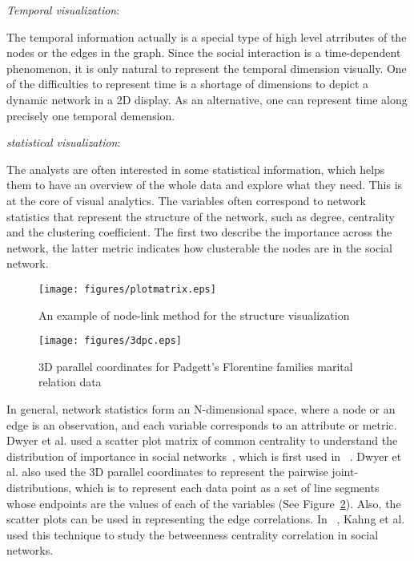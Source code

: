 \textit{Temporal visualization}:

The temporal information actually is a special type of high level
atrributes of the nodes or the edges in the graph. Since the social
interaction is a time-dependent phenomenon, it is only natural to
represent the temporal dimension visually. One of the
difficulties to represent time is a shortage of dimensions to depict a
dynamic network in a 2D display. As an alternative, one can represent
time along precisely one temporal demension. 

\textit{statistical visualization}:

The analysts are often interested in some statistical information,
which helps them to have an overview of the whole data and explore what
they need. This is at the core of visual analytics. The variables
often correspond to network statistics that represent the structure of
the network, such as degree, centrality~\cite{freeman1979centrality} and the clustering
coefficient. The first two describe the importance across the network,
the latter metric indicates how clusterable the nodes are in the social
network. 

\begin{figure}[!htb]
  \centering
  \texttt{[image: figures/plotmatrix.eps]}
  \caption{An example of node-link method for the structure visualization ~\cite{dwyer2006visual}}
  \label{fig:plotmatrix}
\end{figure}

\begin{figure}[!htb]
  \centering
  \texttt{[image: figures/3dpc.eps]}
  \caption{3D parallel coordinates for Padgett’s Florentine families marital relation data ~\cite{dwyer2006visual}}
  \label{fig:dpc}
\end{figure}


In general, network statistics form an N-dimensional space, where a
node or an edge is an observation, and each variable corresponds to an
attribute or metric. Dwyer et al. used a scatter plot matrix of common
centrality to understand the distribution of importance in social
networks~\cite{dwyer2006visual}, which is first used in
~\cite{koschutzki4comparison}. Dwyer et al. also used the 3D parallel
coordinates to represent the pairwise joint-distributions, which is to
represent each data point as a set of line segments whose endpoints
are the values of each of the variables (See Figure~\ref{fig:dpc}). Also, the scatter plots can
be used in representing the edge correlations. In
~\cite{goh2003betweenness}, Kahng et al. used this technique to study the
betweenness centrality correlation in social networks.

